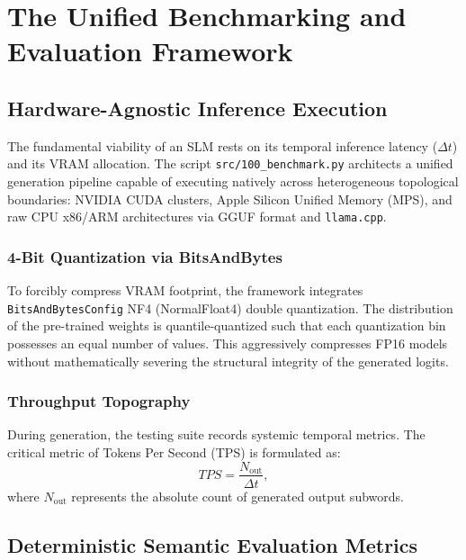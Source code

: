 \documentclass[12pt,a4paper]{report}
\begin{document}
\chapter{The Unified Benchmarking and Evaluation Framework}
\label{chap:benchmarking}

\section{Hardware-Agnostic Inference Execution}

The fundamental viability of an SLM rests on its temporal inference latency ($\Delta t$) and its VRAM allocation. The script \texttt{src/100_benchmark.py} architects a unified generation pipeline capable of executing natively across heterogeneous topological boundaries: NVIDIA CUDA clusters, Apple Silicon Unified Memory (MPS), and raw CPU x86/ARM architectures via GGUF format and \texttt{llama.cpp}.

\subsection{4-Bit Quantization via BitsAndBytes}
To forcibly compress VRAM footprint, the framework integrates \texttt{BitsAndBytesConfig} NF4 (NormalFloat4) double quantization. The distribution of the pre-trained weights is quantile-quantized such that each quantization bin possesses an equal number of values. This aggressively compresses FP16 models without mathematically severing the structural integrity of the generated logits.

\subsection{Throughput Topography}
During generation, the testing suite records systemic temporal metrics. The critical metric of Tokens Per Second (TPS) is formulated as:
\begin{equation}
    TPS = \frac{N_{\text{out}}}{\Delta t},
\end{equation}
where $N_{\text{out}}$ represents the absolute count of generated output subwords.

\section{Deterministic Semantic Evaluation Metrics}
\end{document}
